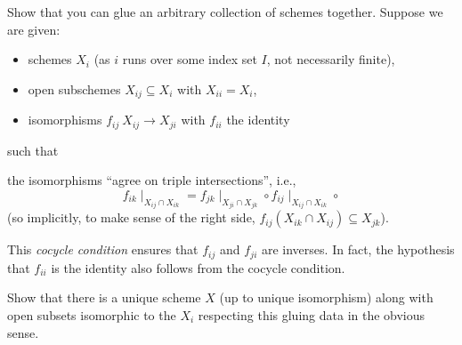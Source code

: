 \documentclass[12pt]{memoir}
\begin{document}
    \begin{ptcbr}
    
    \end{ptcbr}

    \begin{Ej}[4.4.A Vakil]
        Show that you can glue an arbitrary collection of schemes together. Suppose we are given:
        \begin{itemize}
            \itemsep=-0.4em
            \item  schemes $X_i$ (as $i$ runs over some index set $I$, not necessarily finite),
            \item open subschemes $X_{ij}\subseteq X_i$ with $X_{ii}=X_i$,
            \item isomorphisms $f_{ij}\:X_{ij}\to X_{ji}$ with $f_{ii}$ the identity
        \end{itemize}
        such that 
        \begin{significant}
            the isomorphisms “agree on triple intersections”,
            i.e.,
            $$f_{ik}\mid_{X_{ij}\cap X_{ik}}= f_{jk}\mid_{X_{ji}\cap X_{jk}}\circ f_{ij}\mid_{X_{ij}\cap X_{ik}}\circ$$
            (so implicitly, to make sense of
            the right side, $f_{ij}(X_{ik}\cap X_{ij})\subseteq X_{jk}$).            
        \end{significant}
        This \emph{cocycle condition} ensures that $f_{ij}$ and $f_{ji}$ are inverses. In fact, the hypothesis that $f_{ii}$ is the identity also follows from the cocycle condition.\par 
        Show that there is a unique scheme $X$ (up to unique isomorphism) along with open subsets isomorphic to the $X_i$ respecting this gluing data in the obvious sense.
    \end{Ej}
    
    \begin{ptcbr}
    
    \end{ptcbr}
        
\end{document}
